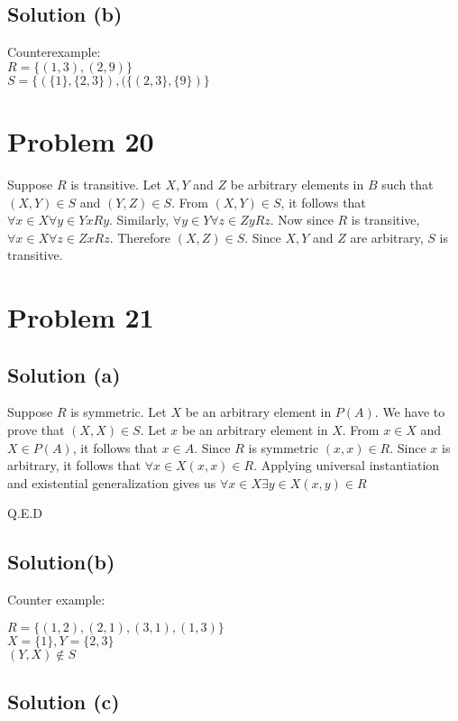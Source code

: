 \documentclass{article}
\begin{document}
\subsection{Solution (b)}

Counterexample: \\
$R = \{(1,3), (2,9)\}$ \\
$S = \{(\{1\},\{2,3\}), (\{(2,3\}, \{9\})\}$ 

\section{Problem 20}

Suppose $R$ is transitive. Let $X,Y$ and $Z$ be arbitrary elements in
$B$ such that $(X,Y) \in S$ and $(Y,Z) \in S$. From $(X,Y) \in S$, it
follows that $\forall x \in X \forall y \in Y xRy$. Similarly,
$\forall y \in Y \forall z \in Z yRz$. Now since $R$ is transitive,
$\forall x \in X \forall z \in Z xRz$. Therefore $(X,Z) \in S$. Since
$X,Y$ and $Z$ are arbitrary, $S$ is transitive.

\section{Problem 21}

\subsection{Solution (a)}

Suppose $R$ is symmetric. Let $X$ be an arbitrary element in $P(A)$.
We have to prove that $(X,X) \in S$. Let $x$ be an arbitrary element
in $X$. From $x \in X$ and $X \in P(A)$, it follows that $x \in A$.
Since $R$ is symmetric $(x,x) \in R$. Since $x$ is arbitrary, it
follows that $\forall x \in X (x,x) \in R$. Applying universal
instantiation and existential generalization gives us $\forall x \in X
\exists y \in X(x,y) \in R$

Q.E.D

\subsection{Solution(b)}

Counter example:

$R = \{(1,2), (2,1), (3,1), (1,3)\}$ \\
$X = \{1\}, Y = \{2,3\}$ \\
$(Y,X) \notin S$

\subsection{Solution (c)}
\end{document}
